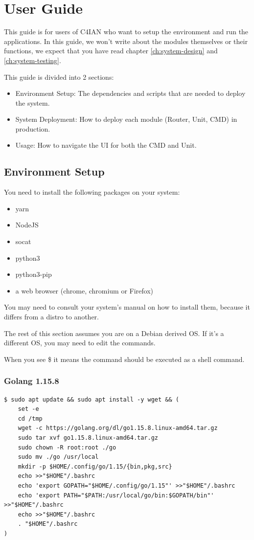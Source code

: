 \chapter{User Guide}
This guide is for users of C4IAN who want to setup the environment and run the applications.
In this guide, we won't write about the modules themselves or their functions, we expect that you have read chapter \ref{ch:system-design} and \ref{ch:system-testing}.

This guide is divided into 2 sections:
\begin{itemize}[itemsep=1pt, topsep=5pt]
    \item Environment Setup: The dependencies and scripts that are needed to deploy the system.
    \item System Deployment: How to deploy each module (Router, Unit, CMD) in production.
    \item Usage: How to navigate the UI for both the CMD and Unit.
\end{itemize}

\section{Environment Setup}
You need to install the following packages on your system:
\begin{itemize}[itemsep=1pt, topsep=5pt]
    \item yarn
    \item NodeJS
    \item socat
    \item python3
    \item python3-pip
    \item a web browser (chrome, chromium or Firefox)
\end{itemize}

You may need to consult your system's manual on how to install them, because it differs from a distro to another.

The rest of this section assumes you are on a Debian derived OS.
If it's a different OS, you may need to edit the commands.

When you see \$ it means the command should be executed as a shell command.

\subsection{Golang 1.15.8}
\begin{verbatim}
$ sudo apt update && sudo apt install -y wget && (
    set -e
    cd /tmp
    wget -c https://golang.org/dl/go1.15.8.linux-amd64.tar.gz
    sudo tar xvf go1.15.8.linux-amd64.tar.gz
    sudo chown -R root:root ./go
    sudo mv ./go /usr/local
    mkdir -p $HOME/.config/go/1.15/{bin,pkg,src}
    echo >>"$HOME"/.bashrc
    echo 'export GOPATH="$HOME/.config/go/1.15"' >>"$HOME"/.bashrc
    echo 'export PATH="$PATH:/usr/local/go/bin:$GOPATH/bin"' >>"$HOME"/.bashrc
    echo >>"$HOME"/.bashrc
    . "$HOME"/.bashrc
)
\end{verbatim}

